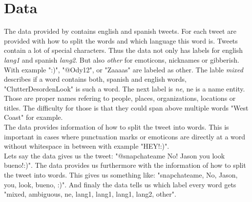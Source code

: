 \section{Data}\label{sec:Data}
The data provided by \cite{workshop} contains english and spanish tweets. For each tweet are provided with how to split the words and which language this word is. Tweets contain a lot of special characters. Thus the data not only has labels for english \textit{lang1} and spanish \textit{lang2}. But also \textit{other} for emoticons, nicknames or gibberish. With example ":)", "@Ody12", or "Zaaaas" are labeled as other. The lable \textit{mixed} describes if a word contains both, spanish and english words, "ClutterDesordenLook" is such a word.  The next label is \textit{ne}, ne is a name entity. Those are proper names refering to people, places, organizations, locations or titles. The difficulty for those is that they could span above multiple words "West Coast" for example. \\
The data provides information of how to split the tweet into words. This is important in cases where punctuation marks or emoticons are directly at a word without whitespace in between with example "HEY!:)". \\
Lets say the data gives us the tweet: "@snapchateame No! Jason you look bueno!:)". The data provides us furthermore with the information of how to split the tweet into words. This gives us something like: "snapchateame, No, Jason, you, look, bueno, :)". And finaly the data tells us which label every word gets "mixed, ambiguous, ne, lang1, lang1, lang1, lang2, other". \\

